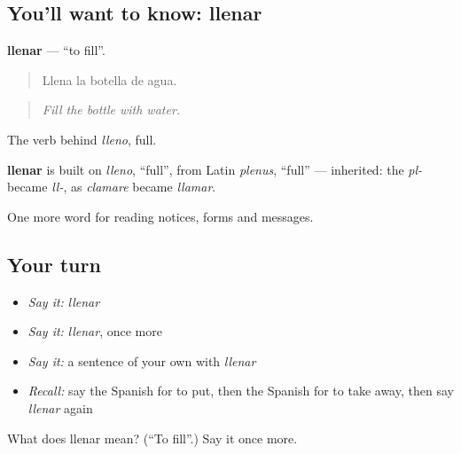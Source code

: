 \subsection*{You'll want to know: llenar}
\textbf{llenar} — \textquotedblleft{}to fill\textquotedblright{}.

\begin{quote}
Llena la botella de agua.
\end{quote}

\begin{quote}
\emph{Fill the bottle with water.}
\end{quote}

The verb behind \emph{lleno}, full.

\begin{cousinweb}
\textbf{llenar} is built on \emph{lleno}, \textquotedblleft{}full\textquotedblright{}, from Latin \emph{plenus}, \textquotedblleft{}full\textquotedblright{} — inherited: the \emph{pl-} became \emph{ll-}, as \emph{clamare} became \emph{llamar}.
\end{cousinweb}

\begin{grammarlens}[title={What you've built}]
One more word for reading notices, forms and messages.
\end{grammarlens}

\subsection*{Your turn}
\begin{itemize}
\raggedright
  \item \emph{Say it:} \emph{llenar}
  \item \emph{Say it:} \emph{llenar}, once more
  \item \emph{Say it:} a sentence of your own with \emph{llenar}
  \item \emph{Recall:} say the Spanish for to put, then the Spanish for to take away, then say \emph{llenar} again
\end{itemize}

\begin{tcolorbox}[breakable,colback=teal!4,colframe=teal!35!black,title={Before you move on}]
What does llenar mean? (\textquotedblleft{}To fill\textquotedblright{}.) Say it once more.
\end{tcolorbox}
